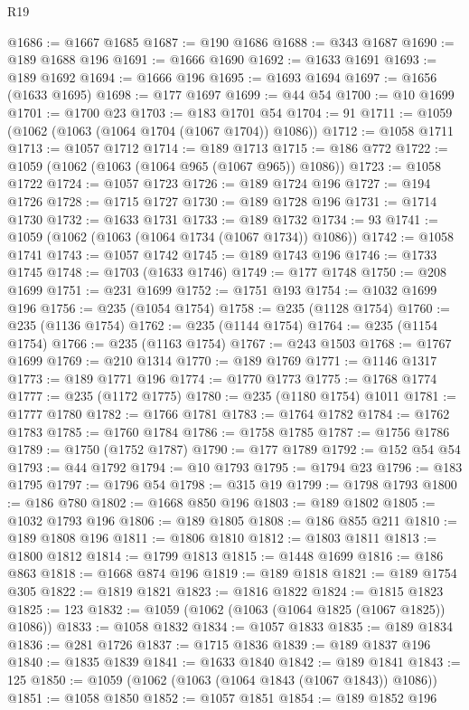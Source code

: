 \begin{lexlean}{R19}
\begin{coremodule}
@1686 := @1667 @1685
@1687 := @190 @1686
@1688 := @343 @1687
@1690 := @189 @1688 @196
@1691 := @1666 @1690
@1692 := @1633 @1691
@1693 := @189 @1692
@1694 := @1666 @196
@1695 := @1693 @1694
@1697 := @1656 (@1633 @1695)
@1698 := @177 @1697
@1699 := @44 @54
@1700 := @10 @1699
@1701 := @1700 @23
@1703 := @183 @1701 @54
@1704 := 91
@1711 := @1059 (@1062 (@1063 (@1064 @1704 (@1067 @1704)) @1086))
@1712 := @1058 @1711
@1713 := @1057 @1712
@1714 := @189 @1713
@1715 := @186 @772
@1722 := @1059 (@1062 (@1063 (@1064 @965 (@1067 @965)) @1086))
@1723 := @1058 @1722
@1724 := @1057 @1723
@1726 := @189 @1724 @196
@1727 := @194 @1726
@1728 := @1715 @1727
@1730 := @189 @1728 @196
@1731 := @1714 @1730
@1732 := @1633 @1731
@1733 := @189 @1732
@1734 := 93
@1741 := @1059 (@1062 (@1063 (@1064 @1734 (@1067 @1734)) @1086))
@1742 := @1058 @1741
@1743 := @1057 @1742
@1745 := @189 @1743 @196
@1746 := @1733 @1745
@1748 := @1703 (@1633 @1746)
@1749 := @177 @1748
@1750 := @208 @1699
@1751 := @231 @1699
@1752 := @1751 @193
@1754 := @1032 @1699 @196
@1756 := @235 (@1054 @1754)
@1758 := @235 (@1128 @1754)
@1760 := @235 (@1136 @1754)
@1762 := @235 (@1144 @1754)
@1764 := @235 (@1154 @1754)
@1766 := @235 (@1163 @1754)
@1767 := @243 @1503
@1768 := @1767 @1699
@1769 := @210 @1314
@1770 := @189 @1769
@1771 := @1146 @1317
@1773 := @189 @1771 @196
@1774 := @1770 @1773
@1775 := @1768 @1774
@1777 := @235 (@1172 @1775)
@1780 := @235 (@1180 @1754) @1011
@1781 := @1777 @1780
@1782 := @1766 @1781
@1783 := @1764 @1782
@1784 := @1762 @1783
@1785 := @1760 @1784
@1786 := @1758 @1785
@1787 := @1756 @1786
@1789 := @1750 (@1752 @1787)
@1790 := @177 @1789
@1792 := @152 @54 @54
@1793 := @44 @1792
@1794 := @10 @1793
@1795 := @1794 @23
@1796 := @183 @1795
@1797 := @1796 @54
@1798 := @315 @19
@1799 := @1798 @1793
@1800 := @186 @780
@1802 := @1668 @850 @196
@1803 := @189 @1802
@1805 := @1032 @1793 @196
@1806 := @189 @1805
@1808 := @186 @855 @211
@1810 := @189 @1808 @196
@1811 := @1806 @1810
@1812 := @1803 @1811
@1813 := @1800 @1812
@1814 := @1799 @1813
@1815 := @1448 @1699
@1816 := @186 @863
@1818 := @1668 @874 @196
@1819 := @189 @1818
@1821 := @189 @1754 @305
@1822 := @1819 @1821
@1823 := @1816 @1822
@1824 := @1815 @1823
@1825 := 123
@1832 := @1059 (@1062 (@1063 (@1064 @1825 (@1067 @1825)) @1086))
@1833 := @1058 @1832
@1834 := @1057 @1833
@1835 := @189 @1834
@1836 := @281 @1726
@1837 := @1715 @1836
@1839 := @189 @1837 @196
@1840 := @1835 @1839
@1841 := @1633 @1840
@1842 := @189 @1841
@1843 := 125
@1850 := @1059 (@1062 (@1063 (@1064 @1843 (@1067 @1843)) @1086))
@1851 := @1058 @1850
@1852 := @1057 @1851
@1854 := @189 @1852 @196

\end{coremodule}
\end{lexlean}
